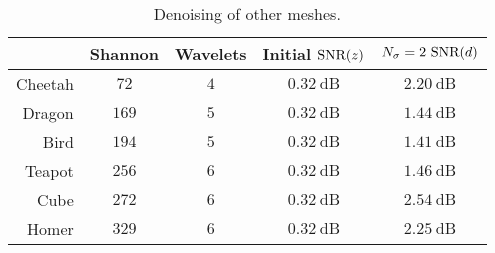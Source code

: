 \begin{table}
	\centering
	\caption[
		Denoising of other meshes
	]{
		Denoising of other meshes.
	}\label{tab:chapter5_denoising}
	\begin{tabular}{@{}rcccc@{}}
		\toprule
		        & Shannon       & Wavelets    & Initial \(\text{SNR}(z)\) & \(N_{\sigma}=2\ \snr{d}\) \\
		\midrule
		Cheetah & \(\num{72}\)  & \(\num{4}\) & \(\SI{0.32}{\dB}\)  & \(\SI{2.20}{\dB}\)        \\
		Dragon  & \(\num{169}\) & \(\num{5}\) & \(\SI{0.32}{\dB}\)  & \(\SI{1.44}{\dB}\)        \\
		Bird    & \(\num{194}\) & \(\num{5}\) & \(\SI{0.32}{\dB}\)  & \(\SI{1.41}{\dB}\)        \\
		Teapot  & \(\num{256}\) & \(\num{6}\) & \(\SI{0.32}{\dB}\)  & \(\SI{1.46}{\dB}\)        \\
		Cube    & \(\num{272}\) & \(\num{6}\) & \(\SI{0.32}{\dB}\)  & \(\SI{2.54}{\dB}\)        \\
		Homer   & \(\num{329}\) & \(\num{6}\) & \(\SI{0.32}{\dB}\)  & \(\SI{2.25}{\dB}\)        \\
		\bottomrule
	\end{tabular}
\end{table}
